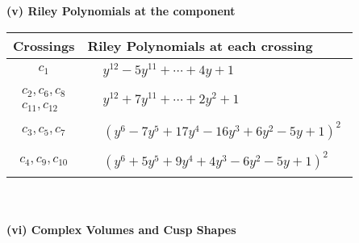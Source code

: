 \documentclass[1p]{elsarticle_modified}
\theoremstyle{definition}
\begin{document}
\newpage\renewcommand{\arraystretch}{1}
\flushleft \textbf{(v) Riley Polynomials at the component}\newline \\
\begin{tabular}{m{50pt}|m{274pt}}
Crossings & \hspace{64pt}Riley Polynomials at each crossing \\
\hline $$\begin{aligned}c_{1}\end{aligned}$$&$\begin{aligned}
&y^{12}-5 y^{11}+\cdots+4 y+1
\end{aligned}$\\
\hline $$\begin{aligned}c_{2},c_{6},c_{8}\\c_{11},c_{12}\end{aligned}$$&$\begin{aligned}
&y^{12}+7 y^{11}+\cdots+2 y^2+1
\end{aligned}$\\
\hline $$\begin{aligned}c_{3},c_{5},c_{7}\end{aligned}$$&$\begin{aligned}
&(y^6-7 y^5+17 y^4-16 y^3+6 y^2-5 y+1)^2
\end{aligned}$\\
\hline $$\begin{aligned}c_{4},c_{9},c_{10}\end{aligned}$$&$\begin{aligned}
&(y^6+5 y^5+9 y^4+4 y^3-6 y^2-5 y+1)^2
\end{aligned}$\\
\hline
\end{tabular}\\~\\
\newpage\flushleft \textbf{(vi) Complex Volumes and Cusp Shapes}
\end{document}
